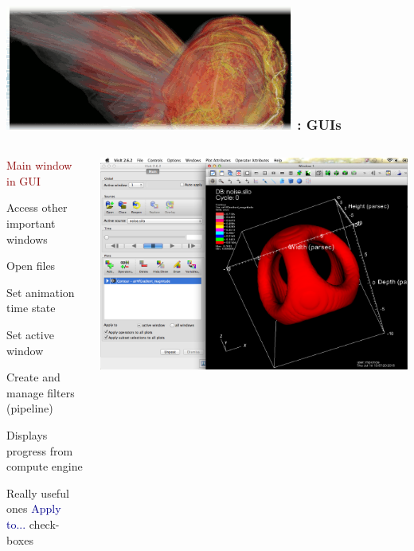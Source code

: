 \begin{frame}
\frametitle{\href{https://wci.llnl.gov/simulation/computer-codes/visit/}{\includegraphics[height=.85cm]{figs/visit-logos/VisIt-03}} \hspace{-.85cm}{\bf \textcolor{lightgray}{VisIt}}: GUIs}

\begin{columns}
\begin{column}{5cm}
\begin{beamerboxesrounded}[upper=block head,lower=block body,shadow=true]{  \textcolor{DarkRed}{Main window in GUI} }

        \textcolor{DarkRed}{} Access other important windows

        \textcolor{DarkRed}{} Open files

        \textcolor{DarkRed}{} Set animation time state

        \textcolor{DarkRed}{} Set active window

        \textcolor{DarkRed}{} Create and manage filters (pipeline)

        \textcolor{DarkRed}{} Displays progress from compute engine
\end{beamerboxesrounded}

\pause
\vspace{1mm}
\begin{beamerboxesrounded}[upper=block head,lower=block body,shadow=true]{ Really useful ones}
        \hspace{1.25mm}
        \textcolor{DarkBlue}{ Apply to... } check-boxes
\end{beamerboxesrounded}
\end{column}
\begin{column}{6cm}
        \centering
        \includegraphics[clip=true,trim=0 0 17cm 0, width=.85\columnwidth]{figs/visit-guis/VisIt_windows}
\end{column}
\end{columns}
\end{frame}


